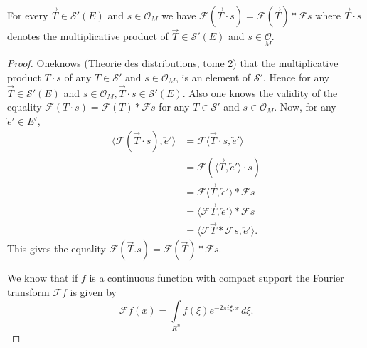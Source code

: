 \begin{prop}\label{chap8:prop8.2}
For every $\overrightarrow{T} \in \mathscr{S}' (E)$ and $s\in
\mathscr{O}_M$ we have $\mathscr{F}
(\overrightarrow{T}\cdot s)=\mathscr{F}(\overrightarrow{T})\ast\mathscr{F} s$ where
$\overrightarrow{T}\cdot s$ denotes the multiplicative product of
$\overrightarrow{T} \in \mathscr{S}' (E)$ and $s \in\underset{M}{\mathscr{O}}$.
\end{prop}

\begin{proof}
One\pageoriginale knows (Theorie des distributions, tome 2) that the multiplicative
product $T\cdot s$ of any $T \in \mathscr{S}'$ and $s \in \mathscr{O}_M$, is
an element of $\mathscr{S}'$. Hence for any $\overrightarrow{T} \in
\mathscr{S}'(E)$ and $s \in \mathscr{O}_M, \overrightarrow{T} \cdot s \in
\mathscr{S}'(E)$. Also one knows the validity of the equality
$\mathscr{F} (T \cdot s) = \mathscr{F} (T) \ast \mathscr{F} s$ for any $T
\in \mathscr{S}'$ and $s \in \mathscr{O}_M$. Now, for any
$\overleftarrow{e}' \in E'$,
\begin{align*}
\langle \mathscr{F} (\overrightarrow{T} \cdot s), \overleftarrow{e}'\rangle
&= \mathscr{F} \langle \overrightarrow{T} \cdot s, \overleftarrow{e}'
\rangle\\
&= \mathscr{F} ( \langle \overrightarrow{T}, \overleftarrow{e}'
\rangle \cdot s)\\
&= \mathscr{F} \langle \overrightarrow{T}, \overleftarrow{e}' \rangle
\ast \mathscr{F} s\\
&= \langle \mathscr{F} \overrightarrow{T}, \overleftarrow{e}'\rangle
\ast \mathscr{F} s\\
&= \langle \mathscr{F} \overrightarrow{T} \ast \mathscr{F} s, \overleftarrow{e}'\rangle.
\end{align*}
This gives the equality $\mathscr{F} (\overrightarrow{T}. s) =
\mathscr{F} (\overrightarrow{T}) \ast \mathscr{F} s$.

We know that if $f$ is a continuous function with compact support the
Fourier transform $\mathscr{F} f$ is given by
$$
\mathscr{F} f(x) = \int\limits_{R^n} f(\xi) e^{-2\pi i \xi.} {}^x\,
d\xi.
$$ 
\end{proof}
